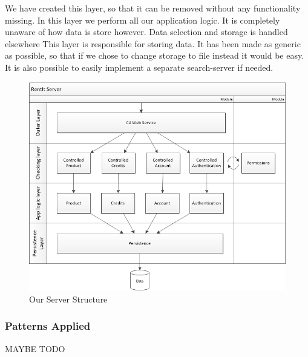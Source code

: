 We have created this layer, so that it can be removed without any functionality missing.
In this layer we perform all our application logic. It is completely unaware of how data is store however. Data selection and storage is handled elsewhere
This layer is responsible for storing data. It has been made as generic as possible, so that if we chose to change storage to file instead it would be easy. It is also possible to easily implement a separate search-server if needed.

\begin{figure}[H]
  \includegraphics[width=\textwidth]{illustrations/ServerStructure.png}
  \caption{Our Server Structure}
  \label{fig:serverstructure}
\end{figure}

\subsubsection{Patterns Applied}
MAYBE TODO
\newpage